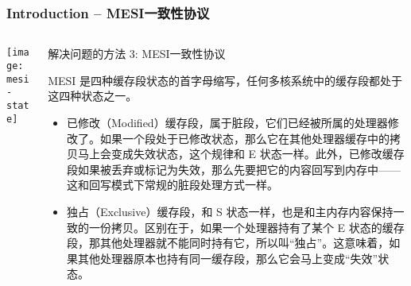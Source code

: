 \begin{frame}[plain]	
	\frametitle{Introduction -- MESI一致性协议}
	
	
	\begin{columns}
		
		\begin{column}{.4\textwidth}
			\texttt{[image: mesi-state]}
		\end{column}
		\begin{column}{.6\textwidth}
			解决问题的方法 3: MESI一致性协议
			
			MESI 是四种缓存段状态的首字母缩写，任何多核系统中的缓存段都处于这四种状态之一。
			\begin{itemize}

				\item 已修改（Modified）缓存段，属于脏段，它们已经被所属的处理器修改了。如果一个段处于已修改状态，那么它在其他处理器缓存中的拷贝马上会变成失效状态，这个规律和 E 状态一样。此外，已修改缓存段如果被丢弃或标记为失效，那么先要把它的内容回写到内存中——这和回写模式下常规的脏段处理方式一样。
				\item 独占（Exclusive）缓存段，和 S 状态一样，也是和主内存内容保持一致的一份拷贝。区别在于，如果一个处理器持有了某个 E 状态的缓存段，那其他处理器就不能同时持有它，所以叫“独占”。这意味着，如果其他处理器原本也持有同一缓存段，那么它会马上变成“失效”状态。
			\end{itemize}

		\end{column}
	\end{columns}
	
\end{frame}





